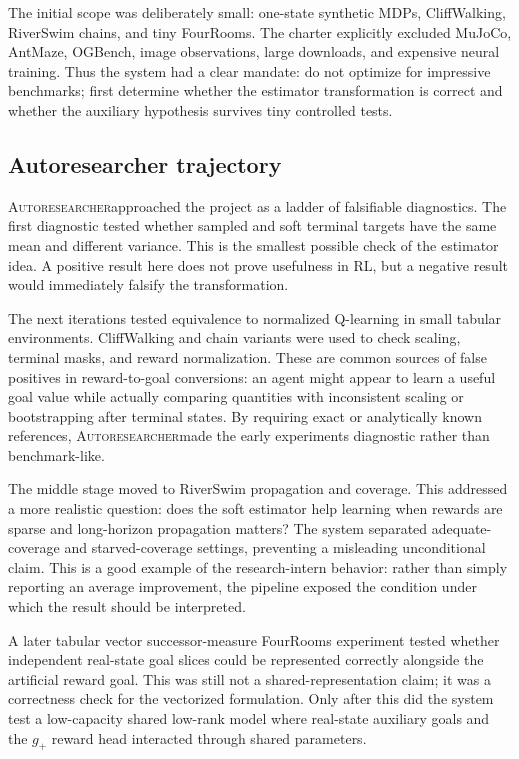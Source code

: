 \documentclass{article}
\newcommand{\sys}{\textsc{Autoresearcher}}
\begin{document}
The initial scope was deliberately small: one-state synthetic MDPs, CliffWalking, RiverSwim chains, and tiny FourRooms. The charter explicitly excluded MuJoCo, AntMaze, OGBench, image observations, large downloads, and expensive neural training. Thus the system had a clear mandate: do not optimize for impressive benchmarks; first determine whether the estimator transformation is correct and whether the auxiliary hypothesis survives tiny controlled tests.

\subsection{Autoresearcher trajectory}

\sys approached the project as a ladder of falsifiable diagnostics. The first diagnostic tested whether sampled and soft terminal targets have the same mean and different variance. This is the smallest possible check of the estimator idea. A positive result here does not prove usefulness in RL, but a negative result would immediately falsify the transformation.

The next iterations tested equivalence to normalized Q-learning in small tabular environments. CliffWalking and chain variants were used to check scaling, terminal masks, and reward normalization. These are common sources of false positives in reward-to-goal conversions: an agent might appear to learn a useful goal value while actually comparing quantities with inconsistent scaling or bootstrapping after terminal states. By requiring exact or analytically known references, \sys made the early experiments diagnostic rather than benchmark-like.

The middle stage moved to RiverSwim propagation and coverage. This addressed a more realistic question: does the soft estimator help learning when rewards are sparse and long-horizon propagation matters? The system separated adequate-coverage and starved-coverage settings, preventing a misleading unconditional claim. This is a good example of the research-intern behavior: rather than simply reporting an average improvement, the pipeline exposed the condition under which the result should be interpreted.

A later tabular vector successor-measure FourRooms experiment tested whether independent real-state goal slices could be represented correctly alongside the artificial reward goal. This was still not a shared-representation claim; it was a correctness check for the vectorized formulation. Only after this did the system test a low-capacity shared low-rank model where real-state auxiliary goals and the \(g_+\) reward head interacted through shared parameters.
\end{document}
